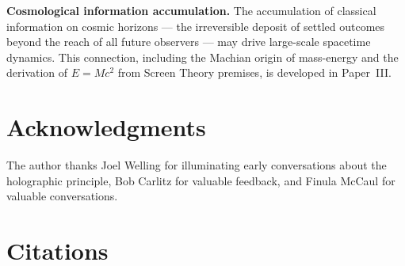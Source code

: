 \documentclass[12pt]{article}
\begin{document}
\medskip
\noindent\textbf{Cosmological information accumulation.}
The accumulation of classical information on cosmic horizons --- the
irreversible deposit of settled outcomes beyond the reach of all future
observers --- may drive large-scale spacetime dynamics.
This connection, including the Machian origin of mass-energy and the
derivation of $E = Mc^2$ from Screen Theory premises, is developed in
Paper~III.

\section*{Acknowledgments}

The author thanks Joel Welling for illuminating early conversations
about the holographic principle, Bob Carlitz for valuable feedback,
and Finula McCaul for valuable conversations.

\section*{Citations}
\end{document}
